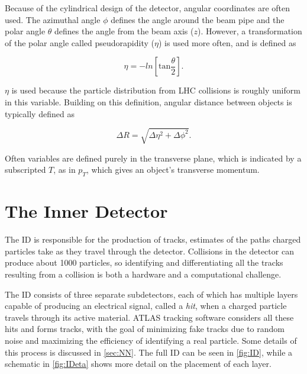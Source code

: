Because of the cylindrical design of the detector, angular coordinates are often used. The azimuthal angle $\phi$ defines the angle around the beam pipe and the polar angle $\theta$ defines the angle from the beam axis ($z$). However, a transformation of the polar angle called pseudorapidity ($\eta$) is used more often, and is defined as 

\begin{equation}
\eta = - ln [ \mathrm{tan} \frac{\theta}{2} ]. 
\end{equation}

$\eta$ is used because the particle distribution from \ac{LHC} collisions is roughly uniform in this variable. Building on this definition, angular distance between objects is typically defined as

\begin{equation}
\Delta R = \sqrt{\Delta\eta^2 + \Delta\phi^2}. 
\end{equation}

Often variables are defined purely in the transverse plane, which is indicated by a subscripted $T$, as in $p_T$, which gives an object's transverse momentum. 


\section{The Inner Detector}
\label{sec:ID}

The \acf{ID} is responsible for the production of tracks, estimates of the paths charged particles take as they travel through the detector. Collisions in the detector can produce about 1000 particles, so identifying and differentiating all the tracks resulting from a collision is both a hardware and a computational challenge. 

The \ac{ID} consists of three separate subdetectors, each of which has multiple layers capable of producing an electrical signal, called a \textit{hit}, when a charged particle travels through its active material. ATLAS tracking software considers all these hits and forms tracks, with the goal of minimizing fake tracks due to random noise and maximizing the efficiency of identifying a real particle. Some details of this process is discussed in \autoref{sec:NN}. The full \ac{ID} can be seen in \autoref{fig:ID}, while a schematic in \autoref{fig:IDeta} shows more detail on the placement of each layer.

